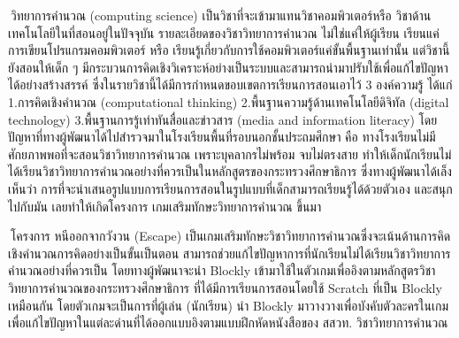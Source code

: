 \maketitle
\makesignature

\ifproject
\begin{abstractTH}

$\>$วิทยาการคำนวณ (computing science) เป็นวิชาที่จะเข้ามาแทนวิชาคอมพิวเตอร์หรือ วิชาด้านเทคโนโลยีในที่สอนอยู่ในปัจจุบัน 
รายละเอียดของวิชาวิทยาการคำนวณ ไม่ใช่แค่ให้ผู้เรียน เรียนแค่การเขียนโปรแกรมคอมพิวเตอร์ หรือ เรียนรู้เกี่ยวกับการใช้คอมพิวเตอร์แค่ขั้นพื้นฐานเท่านั้น 
แต่วิชานี้ยังสอนให้เด็ก ๆ มีกระบวนการคิดเชิงวิเคราะห์อย่างเป็นระบบและสามารถนำมาปรับใช้เพื่อแก้ไขปัญหาได้อย่างสร้างสรรค์ 
ซึ่งในรายวิชานี้ได้มีการกำหนดขอบเขตการเรียนการสอนเอาไว้ 3 องค์ความรู้ ได้แก่ \newline 
1.การคิดเชิงคำนวณ (computational thinking) 2.พื้นฐานความรู้ด้านเทคโนโลยีดิจิทัล (digital technology) 
3.พื้นฐานการรู้เท่าทันสื่อและข่าวสาร (media and information literacy) 
โดยปัญหาที่ทางผู้พัฒนาได้ไปสำรวจมาในโรงเรียนพื้นที่รอบนอกชั้นประถมศึกษา คือ ทางโรงเรียนไม่มีศักยภาพพอที่จะสอนวิชาวิทยาการคำนวณ 
เพราะบุคลากรไม่พร้อม จบไม่ตรงสาย ทำให้เด็กนักเรียนไม่ได้เรียนวิชาวิทยาการคำนวณอย่างที่ควรเป็นในหลักสูตรของกระทรวงศึกษาธิการ 
ซึ่งทางผู้พัฒนาได้เล็งเห็นว่า การที่จะนำเสนอรูปแบบการเรียนการสอนในรูปแบบที่เด็กสามารถเรียนรู้ได้ด้วยตัวเอง และสนุกไปกับมัน 
เลยทำให้เกิดโครงการ เกมเสริมทักษะวิทยาการคำนวณ ขึ้นมา

$\>$โครงการ หนีออกจากวังวน (Escape) เป็นเกมเสริมทักษะวิชาวิทยาการคำนวณซึ่งจะเน้นด้านการคิดเชิงคำนวณการคิดอย่างเป็นขั้นเป็นตอน
สามารถช่วยแก้ไขปัญหาการที่นักเรียนไม่ได้เรียนวิชาวิทยาการคำนวณอย่างที่ควรเป็น 
โดยทางผู้พัฒนาจะนำ Blockly เข้ามาใช้ในตัวเกมเพื่ออิงตามหลักสูตรวิชาวิทยาการคำนวณของกระทรวงศึกษาธิการ 
ที่ได้มีการเรียนการสอนโดยใช้ Scratch ที่เป็น Blockly เหมือนกัน 
โดยตัวเกมจะเป็นการที่ผู้เล่น (นักเรียน) นำ Blockly มาวางวางเพื่อบังคับตัวละครในเกมเพื่อแก้ไขปัญหาในแต่ละด่านที่ได้ออกแบบอิงตามแบบฝึกหัดหนังสือของ 
สสวท. วิชาวิทยาการคำนวณ
\end{abstractTH}

